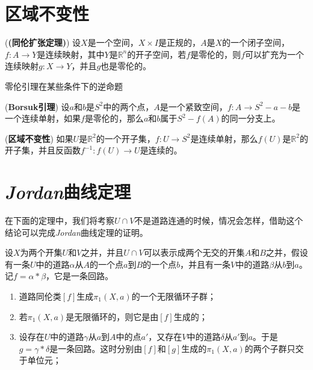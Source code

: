 \section{区域不变性}

\begin{mdframed}
    \begin{lemma}
        (\textbf{(同伦扩张定理)}) 设$X$是一个空间，$X\times I$是正规的，$A$是$X$的一个闭子空间，$f:A\rightarrow Y$是连续映射，其中$Y$是$\mathbb{R}^n$的开子空间，若$f$是零伦的，则$f$可以扩充为一个连续映射$g:X\rightarrow Y$，并且$g$也是零伦的。
    \end{lemma}
\end{mdframed}

零伦引理在某些条件下的逆命题

\begin{mdframed}
    \begin{lemma}
        (\textbf{Borsuk引理}) 设$a$和$b$是$S^2$中的两个点，$A$是一个紧致空间，$f:A\rightarrow S^2-a-b$是一个连续单射，如果$f$是零伦的，那么$a$和$b$属于$S^2-f(A)$的同一分支上。
    \end{lemma}
\end{mdframed}

\begin{mdframed}
    \begin{theorem}
        (\textbf{区域不变性}) 如果$U$是$\mathbb{R}^2$的一个开子集，$f:U\rightarrow S^2$是连续单射，那么$f(U)$是$\mathbb{R}^2$的开子集，并且反函数$f^{-1}:f(U)\rightarrow U$是连续的。
    \end{theorem}
\end{mdframed}


\section{\textsl{Jordan}曲线定理}

在下面的定理中，我们将考察$U\cap V$不是道路连通的时候，情况会怎样，借助这个结论可以完成\textsl{Jordan}曲线定理的证明。

\begin{mdframed}
    \begin{theorem}
        设$X$为两个开集$U$和$V$之并，并且$U\cap V$可以表示成两个无交的开集$A$和$B$之并，假设有一条$U$中的道路$\alpha$从$A$的一个点$a$到$B$的一个点$b$，并且有一条$V$中的道路$\beta$从$b$到$a$。记$f=\alpha*\beta$，它是一条回路。
        \begin{enumerate}[itemindent=2em]
            \item 道路同伦类$[f]$生成$\pi_1(X,a)$的一个无限循环子群；
            \item 若$\pi_1(X,a)$是无限循环的，则它是由$[f]$生成的；
            \item 设存在$U$中的道路$\gamma$从$a$到$A$中的点$a'$，又存在$V$中的道路$\delta$从$a'$到$a$。于是$g=\gamma *\delta$是一条回路。这时分别由$[f]$和$[g]$生成的$\pi_1(X,a)$的两个子群只交于单位元；
        \end{enumerate}
    \end{theorem}
\end{mdframed}

